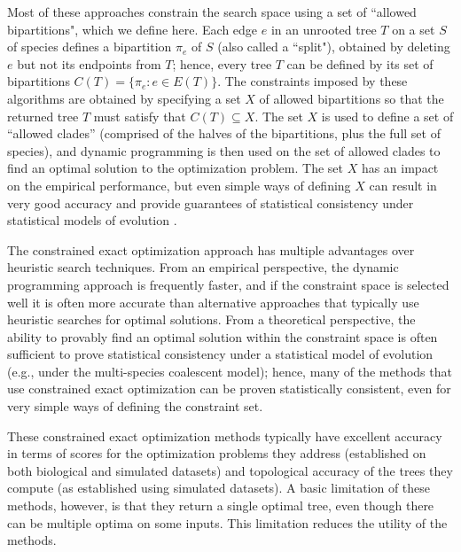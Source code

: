 Most of these  approaches constrain the search space using  a set of ``allowed bipartitions", which we define here.
Each edge $e$ in an unrooted tree $T$ on a set $S$ of species defines a bipartition $\pi_e$  of $S$ (also called a ``split"), obtained by deleting $e$ but not its endpoints from $T$; hence, every tree $T$ can be defined by its set of bipartitions $C(T) = \{\pi_e: e \in E(T)\}$.
The constraints imposed by these algorithms are obtained by specifying a set $X$ of allowed bipartitions so that the returned tree $T$ must satisfy that $C(T) \subseteq  X$.
The set $X$ is used to define a set of ``allowed clades'' (comprised of the halves of the bipartitions, plus the full set of species), and dynamic programming is then used on the set of allowed clades  to  find an optimal solution to the optimization problem.  
The set $X$ has an impact on the empirical performance, but even simple ways of defining $X$ can result in very good accuracy and provide guarantees of statistical consistency under statistical models of evolution \cite{mirarab2015astral,vachaspati2017fastrfs}.

The constrained exact optimization approach has multiple advantages over heuristic search techniques. 
From an empirical perspective, the dynamic programming approach is frequently faster, and if the constraint space is selected well it is often more accurate than alternative approaches that typically use heuristic searches for optimal solutions.
From a theoretical perspective, the ability to provably find an optimal solution within the constraint space is often sufficient to prove statistical consistency under a statistical model of evolution (e.g., under the multi-species coalescent model); hence, many of the methods that use constrained exact optimization can be proven statistically consistent, even for very simple ways of defining the constraint set. 

These constrained exact optimization methods typically have excellent accuracy in terms of  scores for the optimization problems they address (established on both biological and simulated datasets) and topological accuracy of the trees they compute (as established using simulated datasets).
A basic limitation of these methods, however, is that they return a single optimal tree, even though there can be multiple optima on some inputs.
This limitation reduces the utility of the methods.


